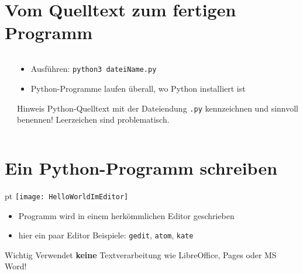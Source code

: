 \section{Vom Quelltext zum fertigen Programm}
\begin{frame}
	\slidehead

	\begin{columns}[T]
		\begin{column}{.4\textwidth}
		\end{column}
		\begin{column}{.6\textwidth}
			\begin{itemize}
				\item Ausführen: \texttt{python3 dateiName.py}
				\item Python-Programme laufen überall, wo Python installiert ist
			\end{itemize}
			\vspace{2cm}
			\begin{block}{Hinweis}
				Python-Quelltext mit der Dateiendung \texttt{.py} kennzeichnen und sinnvoll benennen! Leerzeichen sind problematisch.
			\end{block}
		\end{column}
	\end{columns}
\end{frame}

\section{Ein Python-Programm schreiben}
\begin{frame}
	\slidehead

	\begin{center}
		 pt
		\texttt{[image: HelloWorldImEditor]}
	\end{center}

	\begin{itemize}
		\item Programm wird in einem herkömmlichen Editor geschrieben
		\item hier ein paar Editor Beispiele: \texttt{gedit}, \texttt{atom}, \texttt{kate}
	\end{itemize}
	\begin{alertblock}{Wichtig}
		Verwendet \textbf{keine} Textverarbeitung wie LibreOffice, Pages oder MS Word!
	\end{alertblock}
\end{frame}

